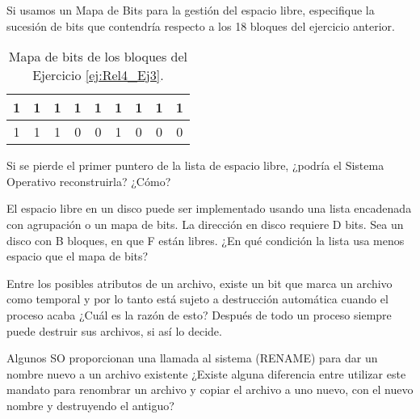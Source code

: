 \begin{ejercicio}
Si usamos un Mapa de Bits para la gestión del espacio libre, especifique la sucesión de bits que contendría
respecto a los 18 bloques del ejercicio anterior.

\begin{table}[H]
    \centering
    \begin{tabular}{ccccccccc}
        1 & 1 & 1 & 1 & 1 & 1 & 1 & 1 & 1 \\ \hline
        1 & 1 & 1 & 0 & 0 & 1 & 0 & 0 & 0
    \end{tabular}
    \caption{Mapa de bits de los bloques del Ejercicio \ref{ej:Rel4_Ej3}.}
\end{table}
\end{ejercicio}

\begin{ejercicio}
Si se pierde el primer puntero de la lista de espacio libre, ¿podría el Sistema Operativo reconstruirla? ¿Cómo?
\end{ejercicio}

\begin{ejercicio}
El espacio libre en un disco puede ser implementado usando una lista encadenada con agrupación o un mapa de bits. La dirección en disco requiere D bits. Sea un disco con B bloques, en que F están libres. ¿En qué condición la lista usa menos espacio que el mapa de bits?
\end{ejercicio}

\begin{ejercicio}
Entre los posibles atributos de un archivo, existe un bit que marca un archivo como temporal y por lo tanto está sujeto a destrucción automática cuando el proceso acaba ¿Cuál es la razón de esto? Después de todo un proceso siempre puede destruir sus archivos, si así lo decide.
\end{ejercicio}

\begin{ejercicio}
Algunos SO proporcionan una llamada al sistema (RENAME) para dar un nombre nuevo a un archivo existente ¿Existe alguna diferencia entre utilizar este mandato para renombrar un archivo y copiar el archivo a uno nuevo, con el nuevo nombre y destruyendo el antiguo?
\end{ejercicio}

